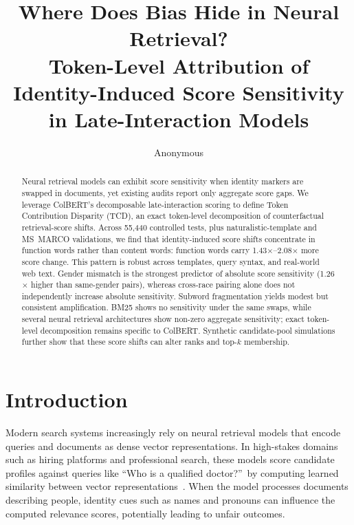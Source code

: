 \documentclass[11pt]{article}
\title{Where Does Bias Hide in Neural Retrieval?\\Token-Level Attribution of Identity-Induced Score Sensitivity\\in Late-Interaction Models}
\author{Anonymous}
\date{}
\begin{document}
\maketitle

\begin{abstract}
Neural retrieval models can exhibit score sensitivity when identity markers are swapped in documents, yet existing audits report only aggregate score gaps. We leverage ColBERT's decomposable late-interaction scoring to define Token Contribution Disparity (TCD), an exact token-level decomposition of counterfactual retrieval-score shifts. Across 55{,}440 controlled tests, plus naturalistic-template and MS~MARCO validations, we find that identity-induced score shifts concentrate in function words rather than content words: function words carry 1.43$\times$--2.08$\times$ more score change. This pattern is robust across templates, query syntax, and real-world web text. Gender mismatch is the strongest predictor of absolute score sensitivity (1.26$\times$ higher than same-gender pairs), whereas cross-race pairing alone does not independently increase absolute sensitivity. Subword fragmentation yields modest but consistent amplification. BM25 shows no sensitivity under the same swaps, while several neural retrieval architectures show non-zero aggregate sensitivity; exact token-level decomposition remains specific to ColBERT. Synthetic candidate-pool simulations further show that these score shifts can alter ranks and top-$k$ membership.
\end{abstract}

\section{Introduction}
\label{sec:intro}

Modern search systems increasingly rely on neural retrieval models that encode queries and documents as dense vector representations. In high-stakes domains such as hiring platforms and professional search, these models score candidate profiles against queries like ``Who is a qualified doctor?''\ by computing learned similarity between vector representations~\citep{singh2018}. When the model processes documents describing people, identity cues such as names and pronouns can influence the computed relevance scores, potentially leading to unfair outcomes.
\end{document}
